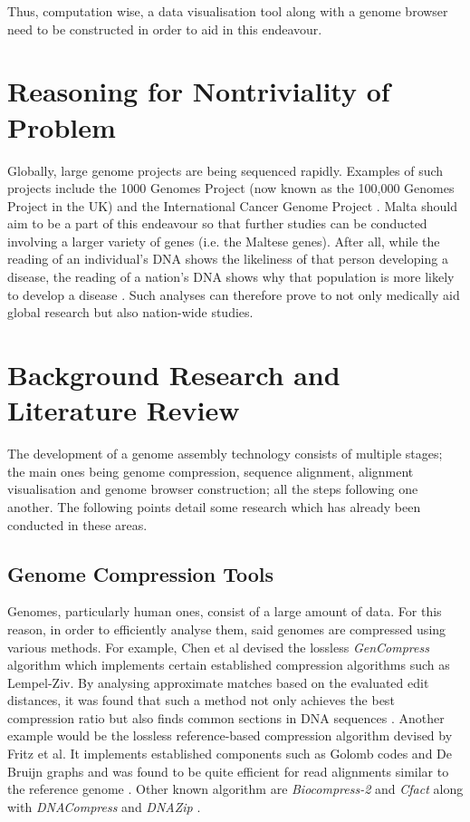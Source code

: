 \documentclass{csfyp}
\begin{document}
Thus, computation wise, a data visualisation tool along with a genome browser need to be constructed in order to aid in this endeavour.  


\section{Reasoning for Nontriviality of Problem}

Globally, large genome projects are being sequenced rapidly.  Examples of such projects include the 1000 Genomes Project (now known as the 100,000 Genomes Project in the UK) and the International Cancer Genome Project \cite{bwtransform, refcompression, popgen}.  Malta should aim to be a part of this endeavour so that further studies can be conducted involving a larger variety of genes (i.e. the Maltese genes).  After all, while the reading of an individual's DNA shows the likeliness of that person developing a disease, the reading of a nation’s DNA shows why that population is more likely to develop a disease \cite{think}.  Such analyses can therefore prove to not only medically aid global research but also nation-wide studies.             


\section{Background Research and Literature Review}

The development of a genome assembly technology consists of multiple stages; the main ones being genome compression, sequence alignment, alignment visualisation and genome browser construction; all the steps following one another.  The following points detail some research which has already been conducted in these areas.

\subsection{Genome Compression Tools}
Genomes, particularly human ones, consist of a large amount of data.  For this reason, in order to efficiently analyse them, said genomes are compressed using various methods.  For example, Chen et al devised the lossless {\textit{GenCompress}} algorithm which implements certain established compression algorithms such as Lempel-Ziv.  By analysing approximate matches based on the evaluated edit distances, it was found that such a method not only achieves the best compression ratio but also finds common sections in DNA sequences \cite{gencompress}.  Another example would be the lossless reference-based compression algorithm devised by Fritz et al.  It implements established components such as Golomb codes and De Bruijn graphs and was found to be quite efficient for read alignments similar to the reference genome \cite{refcompression}.  Other known algorithm are {\textit{Biocompress-2}} and {\textit{Cfact}} \cite{gencompress} along with {\textit{DNACompress}} and {\textit{ DNAZip}} \cite{refcompression}.          
\end{document}
